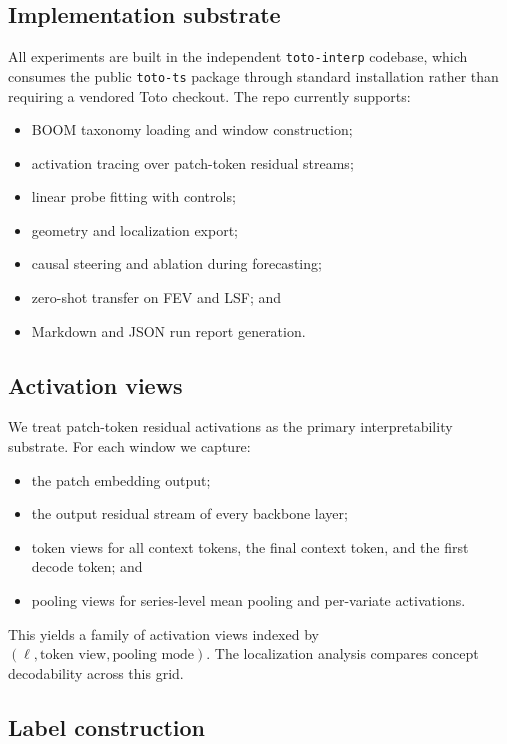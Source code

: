 \documentclass{article}
\newcommand{\boom}{\textsc{BOOM}}
\newcommand{\fev}{\textsc{FEV}}
\newcommand{\lsf}{\textsc{LSF}}
\newcommand{\repo}{\texttt{toto-interp}}
\begin{document}
\subsection{Implementation substrate}

All experiments are built in the independent \repo{} codebase, which consumes the public \texttt{toto-ts} package through standard installation rather than requiring a vendored Toto checkout. The repo currently supports:
\begin{itemize}[leftmargin=18pt]
\item \boom{} taxonomy loading and window construction;
\item activation tracing over patch-token residual streams;
\item linear probe fitting with controls;
\item geometry and localization export;
\item causal steering and ablation during forecasting;
\item zero-shot transfer on \fev{} and \lsf{}; and
\item Markdown and JSON run report generation.
\end{itemize}

\subsection{Activation views}

We treat patch-token residual activations as the primary interpretability substrate. For each window we capture:
\begin{itemize}[leftmargin=18pt]
\item the patch embedding output;
\item the output residual stream of every backbone layer;
\item token views for all context tokens, the final context token, and the first decode token; and
\item pooling views for series-level mean pooling and per-variate activations.
\end{itemize}

This yields a family of activation views indexed by $(\ell, \text{token view}, \text{pooling mode})$. The localization analysis compares concept decodability across this grid.

\subsection{Label construction}
\end{document}
